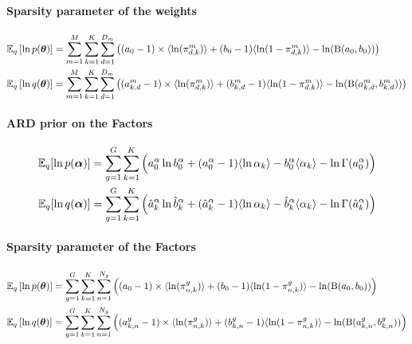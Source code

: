 \paragraph*{Sparsity parameter of the weights}

\begin{equation} \begin{aligned}
	  &\mathbb{E}_q\left[ \ln p(\mbox{\boldmath $\theta$}) \right] = \sum_{m=1}^M \sum_{k=1}^K\sum_{d=1}^{D_m}\left( (a_0 - 1) \times \langle \ln(\pi^m_{d, k}) \rangle + (b_0 -1) \langle \ln(1 - \pi^m_{d, k}) \rangle - \ln (\mathrm{B} (a_0, b_0))\right) \\
	  &\mathbb{E}_q\left[ \ln q(\mbox{\boldmath $\theta$}) \right] = \sum_{m=1}^M \sum_{k=1}^K\sum_{d=1}^{D_m}\left( (a^m_{k,d} - 1) \times \langle \ln(\pi^m_{d, k}) \rangle + (b^m_{k,d} -1) \langle \ln(1 - \pi^m_{d, k}) \rangle - \ln (\mathrm{B} (a^m_{k,d}, b^m_{k,d})) \right) \\
\end{aligned} \end{equation}

\paragraph*{ARD prior on the Factors}

\begin{equation} \begin{aligned}
	\mathbb{E}_q [\ln p(\mbox{\boldmath $\alpha$})] &= \sum_{g=1}^{G}\sum_{k=1}^{K}\Big(a_0^\alpha\ln b_0^\alpha +   (a_0^\alpha - 1) \langle \ln \alpha_k \rangle - b_0^\alpha \langle \alpha_k \rangle - \ln \Gamma(a_0^\alpha) \Big) \\
	\mathbb{E}_q [\ln q(\mbox{\boldmath $\alpha$})] &= \sum_{g=1}^{G}\sum_{k=1}^{K} \Big( \hat{a}_{k}^\alpha \ln \hat{b}_{k}^\alpha + (\hat{a}_{k}^\alpha - 1) \langle \ln \alpha_k \rangle - \hat{b}_{k}^\alpha \langle \alpha_k \rangle - \ln \Gamma(\hat{a}_{k}^\alpha) \Big)
\end{aligned} \end{equation}

\paragraph*{Sparsity parameter of the Factors}
\begin{equation} \begin{aligned}
	  &\mathbb{E}_q\left[ \ln p(\mbox{\boldmath $\theta$}) \right] = \sum_{g=1}^G \sum_{k=1}^K\sum_{n=1}^{N_g}\left( (a_0 - 1) \times \langle \ln(\pi^g_{n, k}) \rangle + (b_0 -1) \langle \ln(1 - \pi^g_{n, k}) \rangle - \ln (\mathrm{B} (a_0, b_0))\right) \\
	  &\mathbb{E}_q\left[ \ln q(\mbox{\boldmath $\theta$}) \right] = \sum_{g=1}^G \sum_{k=1}^K\sum_{n=1}^{N_g}\left( (a^g_{k,n} - 1) \times \langle \ln(\pi^g_{n, k}) \rangle + (b^g_{k,n} -1) \langle \ln(1 - \pi^g_{n, k}) \rangle - \ln (\mathrm{B} (a^g_{k,n}, b^g_{k,n})) \right) \\
\end{aligned} \end{equation}

